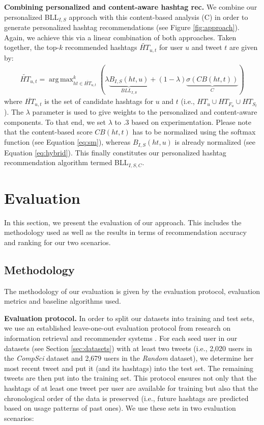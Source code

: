 \documentclass{sig-alternate-05-2015}
\DeclareMathOperator*{\argmax}{arg\,max}
\newcommand{\para}[1]{\vspace{2mm}\noindent\textbf{#1}}
\begin{document}
\para{Combining personalized and content-aware hashtag rec.} We combine our personalized BLL$_{I,S}${} approach with this content-based analysis (C) in order to generate personalized hashtag recommendations (see Figure \ref{fig:approach}). Again, we achieve this via a linear combination of both approaches. Taken together, the top-$k$ recommended hashtags $\widetilde{HT}_{u,t}$ for user $u$ and tweet $t$ are given by:
\begin{equation}
\begin{split}
	\widetilde{HT}_{u,t} = \argmax_{ht \in \overline{HT}_{u,t}}^{k}(\lambda \underbrace{B_{I,S}(ht, u)}_{BLL_{I,S}} + (1 - \lambda) \underbrace{\sigma(CB(ht, t))}_{C})
\end{split}
\end{equation}
where $\overline{HT}_{u,t}$ is the set of candidate hashtags for $u$ and $t$ (i.e., $HT_u \cup HT_{F_u} \cup HT_{S_t}$). The $\lambda$ parameter is used to give weights to the personalized and content-aware components. To that end, we set $\lambda$ to .3 based on experimentation. Please note that the content-based score $CB(ht, t)$ has to be normalized using the softmax function (see Equation \ref{eq:sm}), whereas $B_{I,S}(ht, u)$ is already normalized (see Equation \ref{eq:hybrid}). This finally constitutes our personalized hashtag recommendation algorithm termed BLL$_{I,S,C}${}.\section{Evaluation} \label{sec:evaluation}
In this section, we present the evaluation of our approach. This includes the methodology used as well as the results in terms of recommendation accuracy and ranking for our two scenarios.

\subsection{Methodology}
The methodology of our evaluation is given by the evaluation protocol, evaluation metrics and baseline algorithms used.

\para{Evaluation protocol.} In order to split our datasets into training and test sets, we use an established leave-one-out evaluation protocol from research on information retrieval and recommender systems \cite{jaschke2008tag}. For each seed user in our datasets (see Section \ref{sec:datasets}) with at least two tweets (i.e., 2,020 users in the \textit{CompSci}{} dataset and 2,679 users in the \textit{Random}{} dataset), we determine her most recent tweet and put it (and its hashtags) into the test set. The remaining tweets are then put into the training set. This protocol ensures not only that the hashtags of at least one tweet per user are available for training but also that the chronological order of the data is preserved (i.e., future hashtags are predicted based on usage patterns of past ones). We use these sets in two evaluation scenarios:
\end{document}
